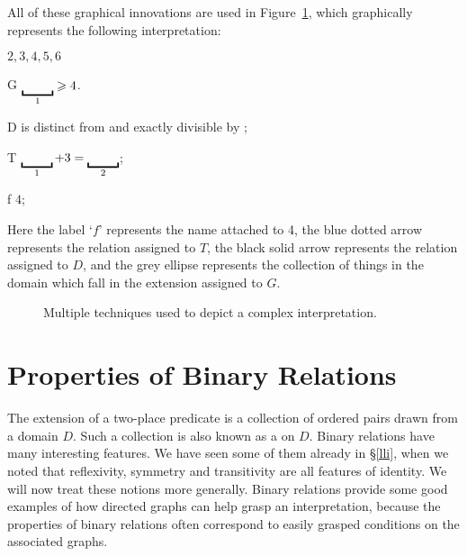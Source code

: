 \begin{earg}
All of these graphical innovations are used in Figure~\ref{fig:complex}, which  graphically represents the following interpretation: \begin{ekey}
	\item[\domain] $2,3,4,5,6$
	\item[G] $\gap{1} \geqslant 4$. 
	\item[D]  is distinct from and exactly divisible by ;
	\item[T] $\gap{1} + 3 = \gap{2}$;
	\item[f] $4$;
\end{ekey} 
Here the label `$f$' represents the name attached to 4, the blue dotted arrow represents the relation assigned to $T$, the black solid arrow represents the relation assigned to $D$, and the grey ellipse represents the collection of things in the domain which fall in the extension assigned to $G$. 
\begin{figure}[b]
\caption{\label{fig:complex}Multiple techniques used to depict a complex interpretation.}
\end{figure}

\section{Properties of Binary Relations} \label{binary}

The extension of a two-place predicate is a collection of ordered pairs drawn from a domain $D$. Such a collection is also known as a  on $D$. Binary relations have many interesting features. We have seen some of them already in §\ref{lli}, when we noted that reflexivity, symmetry and transitivity are all features of identity. We will now treat these notions more generally. Binary relations provide some good examples of how directed graphs can help grasp an interpretation, because the properties of binary relations often correspond to easily grasped conditions on the associated graphs.


\end{earg}
